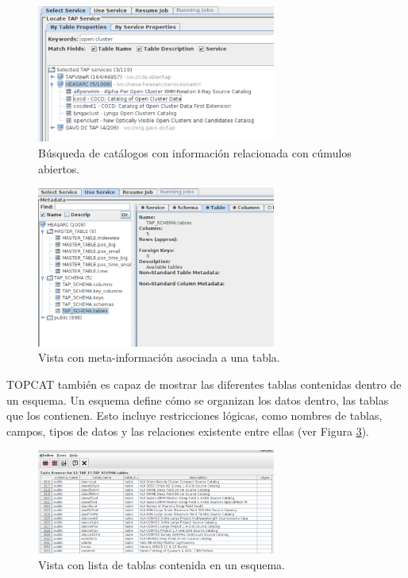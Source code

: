 \begin{figure}
	\centering
	\includegraphics[width=0.7\textwidth]{img/tesis/tap_service.pdf}
	\caption{Búsqueda de catálogos con información relacionada con cúmulos abiertos.}
	\label{fig:tap_query_oc}
\end{figure}

\begin{figure}
	\centering
	\includegraphics[width=0.7\textwidth]{img/tesis/tap_schema.pdf}
	\caption{Vista con meta-información asociada a una tabla.}
	\label{fig:tap_table_metadata}
\end{figure}

TOPCAT también es capaz de mostrar las diferentes tablas contenidas dentro de un esquema. Un esquema define cómo se organizan los datos dentro, las tablas que los contienen. Esto incluye restricciones lógicas, como nombres de tablas, campos, tipos de datos y las relaciones existente entre ellas (ver Figura \ref{fig:tap_schema_detail}).\par

\begin{figure}
	\centering
	\includegraphics[width=0.7\textwidth]{img/tesis/tap_schema_detail.pdf}
	\caption{Vista con lista de tablas contenida en un esquema.}
	\label{fig:tap_schema_detail}
\end{figure}


